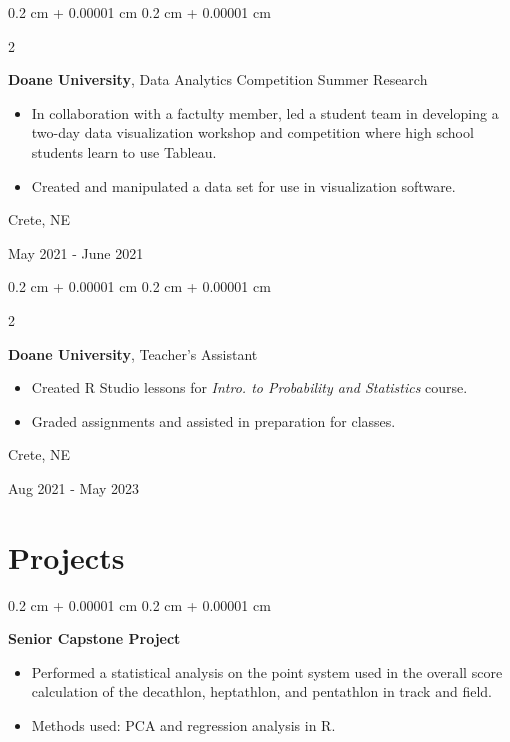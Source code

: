 \documentclass[10pt, letterpaper]{article}
\newenvironment{highlights}{
    \begin{itemize}[
        topsep=0.10 cm,
        parsep=0.10 cm,
        partopsep=0pt,
        itemsep=0pt,
        leftmargin=0.4 cm + 10pt
    ]
}{
    \end{itemize}
} %
\newenvironment{onecolentry}{
    \begin{adjustwidth}{
        0.2 cm + 0.00001 cm
    }{
        0.2 cm + 0.00001 cm
    }
}{
    \end{adjustwidth}
} %
\newenvironment{twocolentry}[2][]{
    \onecolentry
    \def\secondColumn{#2}
    \setcolumnwidth{\fill, 4.5 cm}
    \begin{paracol}{2}
}{
    \switchcolumn \raggedleft \secondColumn
    \end{paracol}
    \endonecolentry
} %
\begin{document}
        \begin{twocolentry}{
            Crete, NE

        May 2021 - June 2021
        }
            \textbf{Doane University}, Data Analytics Competition Summer Research
            \begin{highlights}
                \item In collaboration with a factulty member, led a student team in developing a two-day data visualization workshop and competition where high school students learn to use Tableau.
                \item Created and manipulated a data set for use in visualization software.
            \end{highlights}
        \end{twocolentry}

         \vspace{0.2 cm}

        \begin{twocolentry}{
            Crete, NE
            
        Aug 2021 - May 2023
        }
            \textbf{Doane University}, Teacher's Assistant
            \begin{highlights}
                \item Created R Studio lessons for \textit{Intro. to Probability and Statistics} course.
                \item Graded assignments and assisted in preparation for classes.
            \end{highlights}
        \end{twocolentry}


    
    \section{Projects}

        
        \begin{onecolentry}{
            
        }
            \textbf{Senior Capstone Project}
            \begin{highlights}
                \item Performed a statistical analysis on the point system used in the overall score calculation of the decathlon, heptathlon, and pentathlon in track and field.
                \item Methods used: PCA and regression analysis in R.
            \end{highlights}
        \end{onecolentry}
\end{document}
